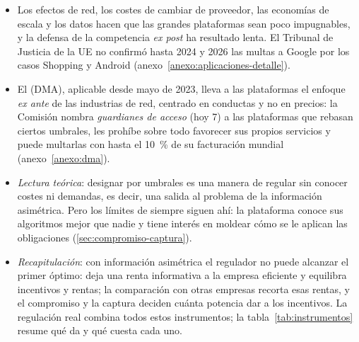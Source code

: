 \documentclass[11pt]{article}
\begin{document}
\begin{itemize}
\item Los efectos de red, los costes de cambiar de proveedor, las economías de escala y los datos hacen que las grandes plataformas sean poco impugnables, y la defensa de la competencia \emph{ex post} ha resultado lenta. El Tribunal de Justicia de la UE no confirmó hasta 2024 y 2026 las multas a Google por los casos Shopping y Android\nocite{TJUE2024GoogleShopping,TJUE2026GoogleAndroid} (anexo~\ref{anexo:aplicaciones-detalle}).
\item El  (DMA), aplicable desde mayo de 2023, lleva a las plataformas el enfoque \emph{ex ante} de las industrias de red, centrado en conductas y no en precios\nocite{UE2022DMA}: la Comisión nombra \emph{guardianes de acceso} (hoy 7) a las plataformas que rebasan ciertos umbrales, les prohíbe sobre todo favorecer sus propios servicios y puede multarlas con hasta el 10~\% de su facturación mundial (anexo~\ref{anexo:dma}).
\item \emph{Lectura teórica}: designar por umbrales es una manera de regular sin conocer costes ni demandas, es decir, una salida al problema de la información asimétrica. Pero los límites de siempre siguen ahí: la plataforma conoce sus algoritmos mejor que nadie y tiene interés en moldear cómo se le aplican las obligaciones (\ref{sec:compromiso-captura}).
\item \emph{Recapitulación}: con información asimétrica el regulador no puede alcanzar el primer óptimo: deja una renta informativa a la empresa eficiente y equilibra incentivos y rentas; la comparación con otras empresas recorta esas rentas, y el compromiso y la captura deciden cuánta potencia dar a los incentivos. La regulación real combina todos estos instrumentos; la tabla~\ref{tab:instrumentos} resume qué da y qué cuesta cada uno.
\end{itemize}
\end{document}
